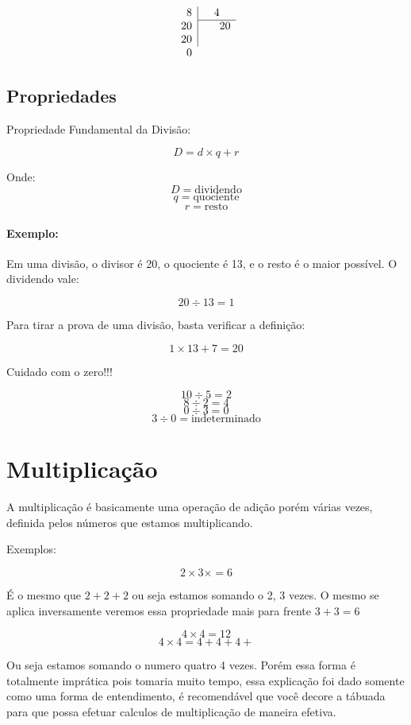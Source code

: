 \documentclass[letterpaper]{book}
\begin{document}
\[
\begin{array}{c|cccc}
\multicolumn{2}{r}{8} & \multicolumn{1}{|}{4} & 4\\
\cline{2-5}
20 & \multicolumn{4}{r}{20} \\
\multicolumn{2}{r}{20} & \multicolumn{1}{|}{} & & \\
\multicolumn{2}{r}{0} & & & \\
\end{array}
\]


\subsection{Propriedades}

Propriedade Fundamental da Divisão:

\[ D = d \times q + r \]

Onde:
\[ D = \text{dividendo} \]
\[ q = \text{quociente} \]
\[ r = \text{resto} \]

\paragraph{Exemplo:}

Em uma divisão, o divisor é 20, o quociente é 13, e o resto é o maior possível. O dividendo vale:

\[ 20 \div 13 = 1 \]

Para tirar a prova de uma divisão, basta verificar a definição:

\[ 1 \times 13 + 7 = 20 \]

Cuidado com o zero!!!

\[ 10 \div 5 = 2 \]
\[ 8 \div 2 = 4 \]
\[ 0 \div 3 = 0 \]
\[ 3 \div 0 = \text{indeterminado} \]

\section{Multiplicação}

A multiplicação é basicamente uma operação de adição porém várias vezes, definida pelos números que estamos multiplicando.


Exemplos:

\[ 2 \times 3 \times = 6\]

É o mesmo que \(2 + 2 + 2\) ou seja estamos somando o 2, 3 vezes. O mesmo se aplica inversamente veremos essa propriedade mais para frente \( 3 + 3 = 6\)
 
\[ 4 \times 4 = 12 \]
\[ 4 \times 4 = 4 + 4 + 4 +\]

Ou seja estamos somando o numero quatro 4 vezes. Porém essa forma é totalmente imprática pois tomaria muito tempo, essa explicação foi dado somente como uma forma de entendimento, é recomendável que você decore a tábuada para que possa efetuar calculos de multiplicação de maneira efetiva.
\end{document}
